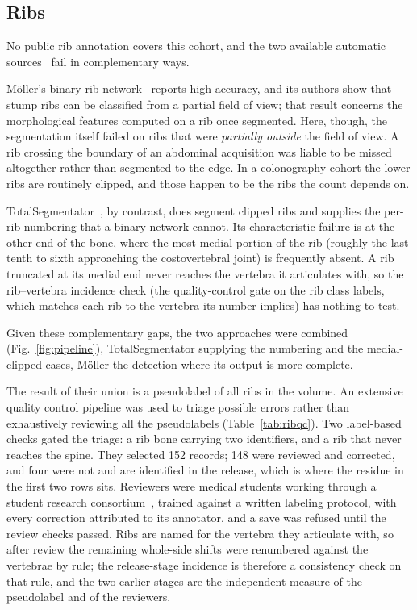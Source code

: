 \documentclass[aapm,mph,amsmath,amssymb,reprint]{revtex4-2}
\newif\ifreview \reviewtrue
\newcommand{\consortium}{\ifreview a student research consortium\else OpenSpineConsortium\fi}
\begin{document}
\subsection{Ribs}

No public rib annotation covers this cohort, and the two available automatic
sources~\cite{moller2026,totalsegmentator} fail in complementary ways.

Möller's binary rib network~\cite{moller2026} reports high accuracy, and its authors show
that stump ribs can be classified from a partial field of view; that result concerns the
morphological features computed on a rib once segmented. Here, though, the segmentation
itself failed on ribs that were \emph{partially outside} the field of view. A rib crossing
the boundary of an abdominal acquisition was liable to be missed altogether rather than
segmented to the edge.  In a colonography cohort the lower ribs are routinely clipped, and
those happen to be the ribs the count depends on.

TotalSegmentator~\cite{totalsegmentator}, by contrast, does segment clipped ribs and supplies the
per-rib numbering that a binary network cannot. Its characteristic failure is at the other end of the bone, where the most medial portion of the rib (roughly the last tenth to sixth
approaching the costovertebral joint) is frequently absent. A rib truncated at its
medial end never reaches the vertebra it articulates with, so the rib--vertebra incidence
check (the quality-control gate on the rib class labels, which matches each rib to the
vertebra its number implies) has nothing to test.

Given these complementary gaps, the two approaches were combined (Fig.~\ref{fig:pipeline}), TotalSegmentator supplying the
numbering and the medial-clipped cases, Möller the detection where its output is more
complete.

The result of their union is a pseudolabel of all ribs in the volume. An extensive quality
control pipeline was used to triage possible errors rather than exhaustively reviewing all the
pseudolabels (Table~\ref{tab:ribqc}). Two label-based checks gated the triage: a rib bone
carrying two identifiers, and a rib that never reaches the spine. They selected 152 records;
148 were reviewed and corrected, and four were not and are identified in the release, which
is where the residue in the first two rows sits.
Reviewers were medical students working through \consortium~\cite{osc2026}, trained against a
written labeling protocol, with every correction attributed to its annotator, and a save was
refused until the review checks passed. Ribs are named for the vertebra they articulate with,
so after review the remaining whole-side shifts were renumbered against the vertebrae by rule;
the release-stage incidence is therefore a consistency check on that rule, and the two earlier
stages are the independent measure of the pseudolabel and of the reviewers.
\end{document}
